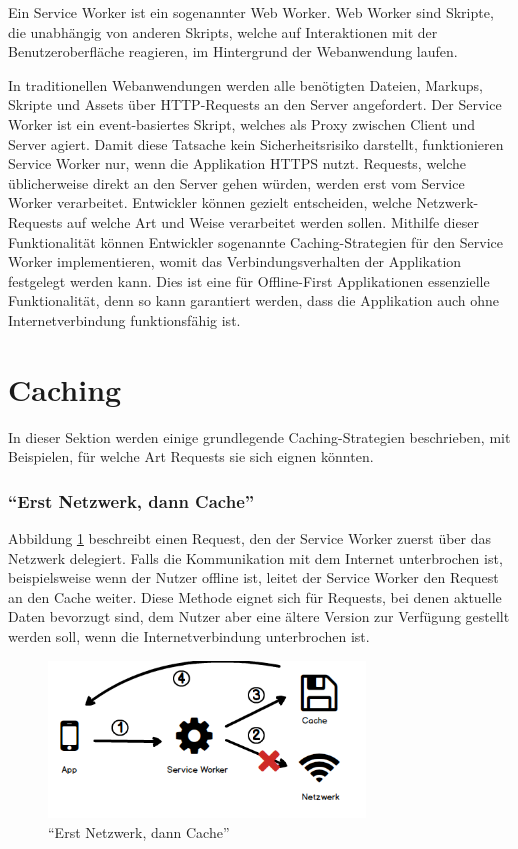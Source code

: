 \documentclass[a4paper, 12pt]{scrreprt}
\begin{document}
Ein Service Worker ist ein sogenannter Web Worker. Web Worker sind Skripte, die unabhängig von anderen Skripts, welche auf Interaktionen mit der Benutzeroberfläche reagieren, im Hintergrund der Webanwendung laufen\autocite{OnlineHTTPWorker}.

In traditionellen Webanwendungen werden alle benötigten Dateien, Markups, Skripte und Assets über \ac{HTTP}-Requests an den Server angefordert. Der Service Worker ist ein event-basiertes Skript, welches als Proxy zwischen Client und Server agiert. Damit diese Tatsache kein Sicherheitsrisiko darstellt, funktionieren Service Worker nur, wenn die Applikation \ac{HTTPS} nutzt. Requests, welche üblicherweise direkt an den Server gehen würden, werden erst vom Service Worker verarbeitet. Entwickler können gezielt entscheiden, welche Netzwerk-Requests auf welche Art und Weise verarbeitet werden sollen. Mithilfe dieser Funktionalität können Entwickler sogenannte Caching-Strategien für den Service Worker implementieren, womit das Verbindungsverhalten der Applikation festgelegt werden kann\autocite{OnlineServiceWorkersAnIntroduction}. Dies ist eine für Offline-First Applikationen essenzielle Funktionalität, denn so kann garantiert werden, dass die Applikation auch ohne Internetverbindung funktionsfähig ist. 

\section{Caching}
In dieser Sektion werden einige grundlegende Caching-Strategien beschrieben, mit Beispielen, für welche Art Requests sie sich eignen könnten.

\subsubsection{\enquote{Erst Netzwerk, dann Cache}}
Abbildung \ref{fig:cachingNetworkFirst} beschreibt einen Request, den der Service Worker zuerst über das Netzwerk delegiert. Falls die Kommunikation mit dem Internet unterbrochen ist, beispielsweise wenn der Nutzer offline ist, leitet der Service Worker den Request an den Cache weiter. Diese Methode eignet sich für Requests, bei denen aktuelle Daten bevorzugt sind, dem Nutzer aber eine ältere Version zur Verfügung gestellt werden soll, wenn die Internetverbindung unterbrochen ist.

\begin{figure}[h]
	\centering
	\includegraphics[width=0.75\textwidth]{networkfirst.png}
	\caption{\enquote{Erst Netzwerk, dann Cache}}
	\label{fig:cachingNetworkFirst}
\end{figure}
\end{document}
